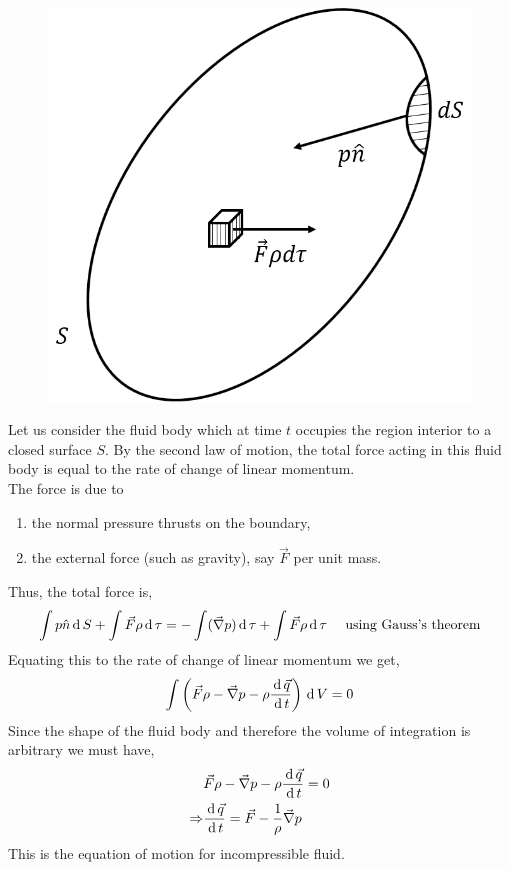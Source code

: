 \documentclass[12pt]{article}
\begin{document}
\begin{soln}
    \begin{figure}[H]
        \begin{center}
            \includegraphics[scale=.75]{img/ass-1-5.1.png}
        \end{center}
    \end{figure}
    Let us consider the fluid body which at time $ t $ occupies the region interior to a closed surface $ S $. By the second law of motion, the total force acting in this fluid body is equal to the rate of change of linear momentum.\\
    The force is due to 
    \begin{enumerate}[label={\roman*)}]
        \item the normal pressure thrusts on the boundary,
        \item the external force (such as gravity), say $ \vec{F} $ per unit mass.
    \end{enumerate}
    Thus, the total force is,
    \[
        \int p\hat{n}\,\mathrm{d}\, S+\int \vec{F}\rho \,\mathrm{d}\,\tau=-\int(\vec{\nabla}p)\,\mathrm{d}\,\tau+\int \vec{F}\rho \,\mathrm{d}\,\tau\quad\text{ using Gauss's theorem}
    \]
    Equating this to the rate of change of linear momentum we get,
    \[
        \int\left( \vec{F}\rho-\vec{\nabla}p-\rho\frac{\,\mathrm{d}\,\vec{q}}{\,\mathrm{d}\, t} \right)\,\mathrm{d}\, V=0
    \]
    Since the shape of the fluid body and therefore the volume of integration is arbitrary we must have,
    \begin{align*}
        &\vec{F}\rho-\vec{\nabla}p-\rho\frac{\,\mathrm{d}\,\vec{q}}{\,\mathrm{d}\, t}=0\\
        \Rightarrow&\frac{\,\mathrm{d}\,\vec{q}}{\,\mathrm{d}\, t}=\vec{F}-\frac{1}{\rho}\vec{\nabla} p
    \end{align*}
    This is the equation of motion for incompressible fluid.
\end{soln}
\end{document}
